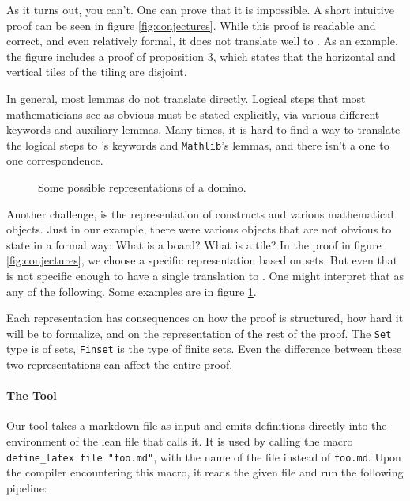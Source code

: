 \documentclass{article}
\newcommand{\code}{\texttt}
\newcommand{\mathlib}{\code{Mathlib}\xspace}
\begin{document}
\begin{center}
\end{center}

As it turns out, you can't. One can prove that it is impossible. A short
intuitive proof can be seen in figure \ref{fig:conjectures}.
While this proof is readable and correct, and even relatively formal, it does
not translate well to \lean.
As an example, the figure includes a proof of proposition 3, which states that
the horizontal and vertical tiles of the tiling are disjoint.

In general, most lemmas do not translate directly. Logical steps that most
mathematicians see as obvious must be stated explicitly, via various different
keywords and auxiliary lemmas.
Many times, it is hard to find a way to translate the logical steps to \lean's
keywords and \mathlib's lemmas, and there isn't a one to one correspondence.

\begin{figure}
    
    \vspace{-2em}
    \caption{Some possible representations of a domino.}
    \label{fig:domino-definitions}
\end{figure}

Another challenge, is the representation of constructs and various mathematical
objects. Just in our example, there were various objects that are not obvious to
state in a formal way: What is a board? What is a tile?
In the proof in figure \ref{fig:conjectures}, we choose a specific
representation based on sets.
But even that is not specific enough to have a single translation to \lean.
One might interpret that as any of the following.
Some examples are in figure \ref{fig:domino-definitions}.

Each representation has consequences on how the proof is
structured, how hard it will be to formalize, and on the representation of the
rest of the proof. The \code{Set} type is of sets, \code{Finset} is the
type of finite sets. Even the difference between these two representations
can affect the entire proof.

\paragraph{The Tool}
Our tool takes a markdown file as input and emits definitions directly into
the environment of the lean file that calls it.
It is used by calling the macro \code{define\_latex file "foo.md"}, with the
name of the file instead of \code{foo.md}.
Upon the compiler encountering this macro, it reads the given file and run the
following pipeline:
\end{document}
